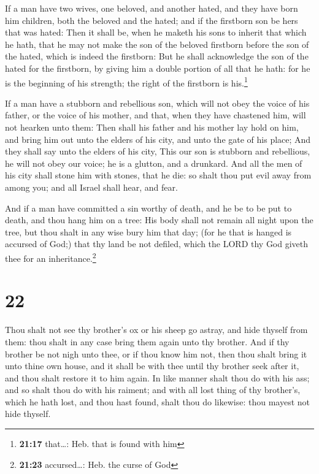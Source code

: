  If a man have two wives, one beloved, and another hated,
and they have born him children, both the beloved and the hated; and if
the firstborn son be hers that was hated:  Then it shall
be, when he maketh his sons to inherit that which he hath, that he may
not make the son of the beloved firstborn before the son of the hated,
which is indeed the firstborn:  But he shall acknowledge
the son of the hated for the firstborn, by giving him a double portion
of all that he hath: for he is the beginning of his strength; the right
of the firstborn is his.\footnote{\textbf{21:17} that\ldots: Heb. that
  is found with him}

 If a man have a stubborn and rebellious son, which will
not obey the voice of his father, or the voice of his mother, and that,
when they have chastened him, will not hearken unto them:
 Then shall his father and his mother lay hold on him,
and bring him out unto the elders of his city, and unto the gate of his
place;  And they shall say unto the elders of his city,
This our son is stubborn and rebellious, he will not obey our voice; he
is a glutton, and a drunkard.  And all the men of his
city shall stone him with stones, that he die: so shalt thou put evil
away from among you; and all Israel shall hear, and fear.

 And if a man have committed a sin worthy of death, and
he be to be put to death, and thou hang him on a tree: 
His body shall not remain all night upon the tree, but thou shalt in any
wise bury him that day; (for he that is hanged is accursed of God;) that
thy land be not defiled, which the LORD thy God giveth thee for an
inheritance.\footnote{\textbf{21:23} accursed\ldots: Heb. the curse of
  God}

\hypertarget{section-21}{%
\section{22}\label{section-21}}

 Thou shalt not see thy brother's ox or his sheep go
astray, and hide thyself from them: thou shalt in any case bring them
again unto thy brother.  And if thy brother be not nigh
unto thee, or if thou know him not, then thou shalt bring it unto thine
own house, and it shall be with thee until thy brother seek after it,
and thou shalt restore it to him again.  In like manner
shalt thou do with his ass; and so shalt thou do with his raiment; and
with all lost thing of thy brother's, which he hath lost, and thou hast
found, shalt thou do likewise: thou mayest not hide thyself.

